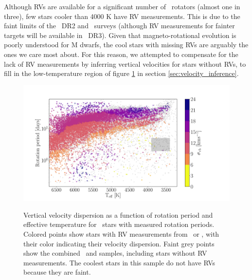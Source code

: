 Although RVs are available for a significant number of \kepler\ rotators
(almost one in three), few stars cooler than 4000 K have RV measurements.
This is due to the faint limits of the \gaia\ DR2 and \lamost\ surveys
(although RV measurements for fainter targets will be available in \gaia\
DR3).
Given that magneto-rotational evolution is poorly understood for M dwarfs, the
cool stars with missing RVs are arguably the ones we care most about.
For this reason, we attempted to compensate for the lack of RV measurements by
inferring vertical velocities for stars without RVs, to fill in the
low-temperature region of figure \ref{fig:existing_rvs} in section
\ref{sec:velocity_inference}.
\begin{figure}[ht!]
\caption{
Vertical velocity dispersion as a function of rotation period and effective
    temperature for \kepler\ stars with measured rotation periods.
Colored points show stars with RV measurements from \gaia\ or \lamost, with
    their color indicating their velocity dispersion.
Faint grey points show the combined \mct\ and \citet{santos2019} samples,
    including stars without RV measurements.
The coolest stars in this sample do not have RVs because they are faint.
}
  \centering \includegraphics[width=1\textwidth]{existing_rvs}
\label{fig:existing_rvs}
\end{figure}

